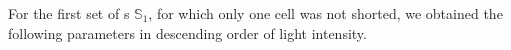 For the first set of \BHSC s $\mathbb{S}_1$, for which only one cell was not shorted, we obtained the following parameters in descending order of light intensity.

